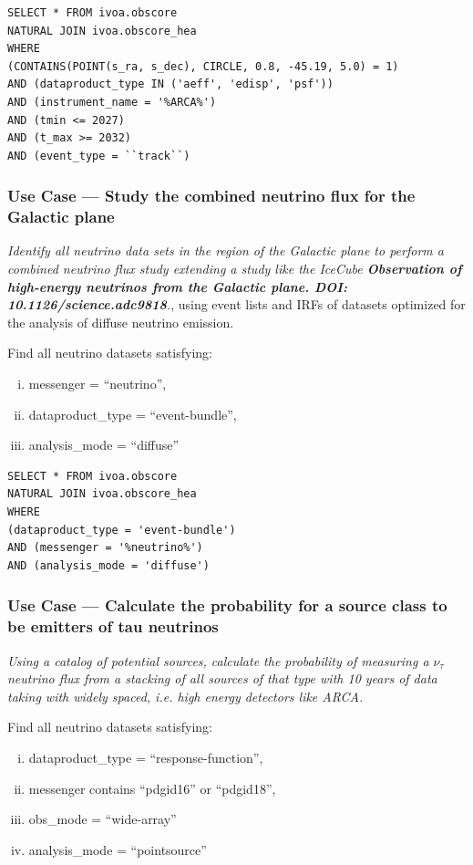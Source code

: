 \begin{verbatim}
SELECT * FROM ivoa.obscore
NATURAL JOIN ivoa.obscore_hea
WHERE
(CONTAINS(POINT(s_ra, s_dec), CIRCLE, 0.8, -45.19, 5.0) = 1)
AND (dataproduct_type IN ('aeff', 'edisp', 'psf'))
AND (instrument_name = '%ARCA%')
AND (tmin <= 2027)
AND (t_max >= 2032)
AND (event_type = ``track``)
\end{verbatim}

\subsubsection{Use Case --- Study the combined neutrino flux for the Galactic plane}

{\em Identify all neutrino data sets in the region of the Galactic plane to perform a combined neutrino flux study extending a study like the IceCube \textbf{Observation of high-energy neutrinos from the Galactic plane. DOI: 10.1126/science.adc9818}.}, using event lists and IRFs of datasets optimized for the analysis of diffuse neutrino emission.

\medskip
\noindent Find all neutrino datasets satisfying:
\begin{enumerate}[(i)]
  \item messenger = ``neutrino'', 
  \item dataproduct\_type = ``event-bundle'',
  \item analysis\_mode = ``diffuse''
\end{enumerate}

\begin{verbatim}
SELECT * FROM ivoa.obscore
NATURAL JOIN ivoa.obscore_hea
WHERE
(dataproduct_type = 'event-bundle')
AND (messenger = '%neutrino%')
AND (analysis_mode = 'diffuse')
\end{verbatim}

\subsubsection{Use Case --- Calculate the probability for a source class to be emitters of tau neutrinos}

{\em Using a catalog of potential sources, calculate the probability of measuring a $\nu_{\tau}$ neutrino flux from a stacking of all sources of that type with 10 years of data taking with widely spaced, i.e. high energy detectors like ARCA.}

\medskip
\noindent Find all neutrino datasets satisfying:
\begin{enumerate}[(i)]
  \item dataproduct\_type = ``response-function'', 
  \item messenger contains ``pdgid16'' or ``pdgid18'',
  \item obs\_mode = ``wide-array''
  \item analysis\_mode = ``pointsource''
\end{enumerate}

